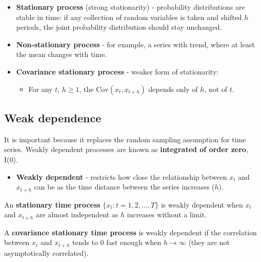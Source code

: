 \documentclass[10pt, a4paper, landscape]{article}
\newcommand{\E}{\mathrm{E}}
\newcommand{\Var}{\mathrm{Var}}
\newcommand{\Cov}{\mathrm{Cov}}
\begin{document}
\begin{multicols}{3}
		\begin{itemize}[leftmargin=*]
			\item \textbf{Stationary process} (strong stationarity) - probability distributions are stable in time: if any collection of random variables is taken and shifted $h$ periods, the joint probability distribution should stay unchanged.
			\item \textbf{Non-stationary process} - for example, a series with trend, where at least the mean changes with time.
			\item \textbf{Covariance stationary process} - weaker form of stationarity:
			
			\begin{itemize}[leftmargin=*]
				
				\item For any $t$, $h \geq 1$, the $\Cov(x_{t}, x_{t + h})$ depends only of $h$, not of $t$.
			\end{itemize}
		\end{itemize}
		
		\subsection*{Weak dependence}
		
		It is important because it replaces the random sampling assumption for time series. Weakly dependent processes are known as \textbf{integrated of order zero}, I(0).
		
		\begin{itemize}[leftmargin=*]
			\item \textbf{Weakly dependent} - restricts how close the relationship between $x_{t}$ and $x_{t + h}$ can be as the time distance between the series increases ($h$).
		\end{itemize}
		
		An \textbf{stationary time process} $\lbrace x_{t} : t = 1, 2, \ldots, T \rbrace$ is weakly dependent when $x_{t}$ and $x_{t + h}$ are almost independent as $h$ increases without a limit.
		
		A \textbf{covariance stationary time process} is weakly dependent if the correlation between $x_{t}$ and $x_{t + h}$ tends to $0$ fast enough when $h \rightarrow \infty$ (they are not asymptotically correlated).
		

\end{multicols}
\end{document}
